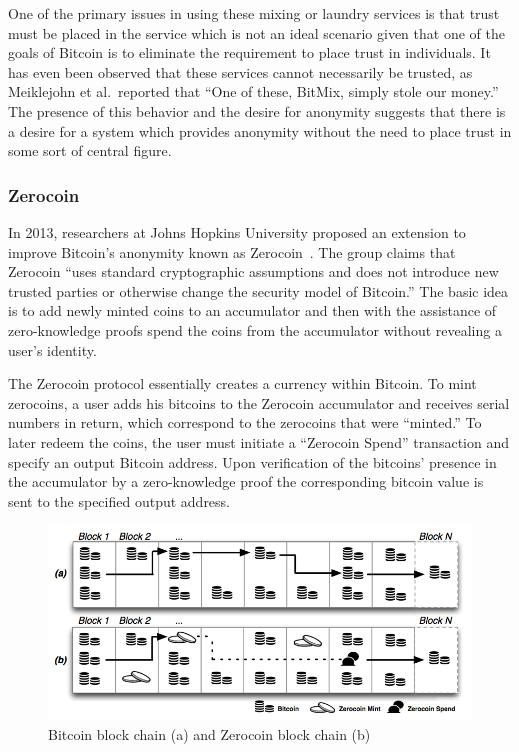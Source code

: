 \documentclass[11pt]{article}
\begin{document}
One of the primary issues in using these mixing or laundry services is that
trust must be placed in the service which is not an ideal scenario given that
one of the goals of Bitcoin is to eliminate the requirement to place trust in
individuals. It has even been observed that these services cannot necessarily be
trusted, as Meiklejohn et al.\ reported that ``One of these, BitMix, simply
stole our money.''~\cite{meiklejohn13} The presence of this behavior and the
desire for anonymity suggests that there is a desire for a system which provides
anonymity without the need to place trust in some sort of central figure.

\subsubsection{Zerocoin}
In 2013, researchers at Johns Hopkins University proposed an extension to
improve Bitcoin's anonymity known as Zerocoin~\cite{miers13}. The group claims
that Zerocoin ``uses standard cryptographic assumptions and does not introduce
new trusted parties or otherwise change the security model of Bitcoin.'' The
basic idea is to add newly minted coins to an accumulator and then with the
assistance of zero-knowledge proofs spend the coins from the accumulator without
revealing a user's identity.

The Zerocoin protocol essentially creates a currency within Bitcoin. To mint
zerocoins, a user adds his bitcoins to the Zerocoin accumulator and receives
serial numbers in return, which correspond to the zerocoins that were ``minted.''
To later redeem the coins, the user must initiate a ``Zerocoin Spend'' transaction
and specify an output Bitcoin address. Upon verification of the bitcoins'
presence in the accumulator by a zero-knowledge proof the
corresponding bitcoin value is sent to the specified output address.

\begin{figure}[H]
    \centering
    \caption[Bitcoin block chain (a) and Zerocoin block chain(b)]{Bitcoin block
        chain (a) and Zerocoin block chain (b)~\cite{miers13}}
    \includegraphics[width=\linewidth]{figures/zerocoin.png}
\end{figure}
\end{document}
